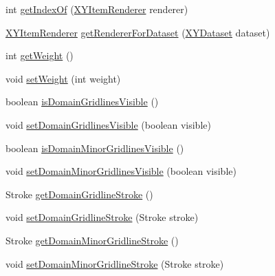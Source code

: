 \begin{DoxyCompactItemize}
\item 
int \mbox{\hyperlink{classorg_1_1jfree_1_1chart_1_1plot_1_1_x_y_plot_a9169a21c1d3f709a3cb2a3afadcde09a}{get\+Index\+Of}} (\mbox{\hyperlink{interfaceorg_1_1jfree_1_1chart_1_1renderer_1_1xy_1_1_x_y_item_renderer}{X\+Y\+Item\+Renderer}} renderer)
\item 
\mbox{\hyperlink{interfaceorg_1_1jfree_1_1chart_1_1renderer_1_1xy_1_1_x_y_item_renderer}{X\+Y\+Item\+Renderer}} \mbox{\hyperlink{classorg_1_1jfree_1_1chart_1_1plot_1_1_x_y_plot_a682acf112cb3afe0f6b8107f7e3aa182}{get\+Renderer\+For\+Dataset}} (\mbox{\hyperlink{interfaceorg_1_1jfree_1_1data_1_1xy_1_1_x_y_dataset}{X\+Y\+Dataset}} dataset)
\item 
int \mbox{\hyperlink{classorg_1_1jfree_1_1chart_1_1plot_1_1_x_y_plot_a98d5fc48e4f913f8b3dd35c8b7a803c6}{get\+Weight}} ()
\item 
void \mbox{\hyperlink{classorg_1_1jfree_1_1chart_1_1plot_1_1_x_y_plot_afaafdbf238357cc108dd1972fa94a7f3}{set\+Weight}} (int weight)
\item 
boolean \mbox{\hyperlink{classorg_1_1jfree_1_1chart_1_1plot_1_1_x_y_plot_a7b58c4b7a9e1a4eb424ff0bc9ce7e99c}{is\+Domain\+Gridlines\+Visible}} ()
\item 
void \mbox{\hyperlink{classorg_1_1jfree_1_1chart_1_1plot_1_1_x_y_plot_aa7eee9b7aba042d305ebd83d927b8cb7}{set\+Domain\+Gridlines\+Visible}} (boolean visible)
\item 
boolean \mbox{\hyperlink{classorg_1_1jfree_1_1chart_1_1plot_1_1_x_y_plot_a90a77c4453eaa2e5f90b08285bdcc457}{is\+Domain\+Minor\+Gridlines\+Visible}} ()
\item 
void \mbox{\hyperlink{classorg_1_1jfree_1_1chart_1_1plot_1_1_x_y_plot_a1ebc5cb4d9ff174ef5bec54ac9f60377}{set\+Domain\+Minor\+Gridlines\+Visible}} (boolean visible)
\item 
Stroke \mbox{\hyperlink{classorg_1_1jfree_1_1chart_1_1plot_1_1_x_y_plot_a6aebe0dc593b268b8f16e8ca68795eae}{get\+Domain\+Gridline\+Stroke}} ()
\item 
void \mbox{\hyperlink{classorg_1_1jfree_1_1chart_1_1plot_1_1_x_y_plot_ac779c1f825681fb1473651580225daf0}{set\+Domain\+Gridline\+Stroke}} (Stroke stroke)
\item 
Stroke \mbox{\hyperlink{classorg_1_1jfree_1_1chart_1_1plot_1_1_x_y_plot_ad020183a555cde4dfb3ea617cf32f10d}{get\+Domain\+Minor\+Gridline\+Stroke}} ()
\item 
void \mbox{\hyperlink{classorg_1_1jfree_1_1chart_1_1plot_1_1_x_y_plot_ab089f2868ebbb6fc14260b23ca95d553}{set\+Domain\+Minor\+Gridline\+Stroke}} (Stroke stroke)

\end{DoxyCompactItemize}

